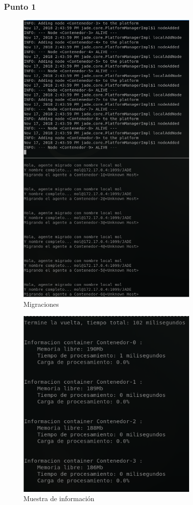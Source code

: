 \documentclass[12pt,journal,compsoc]{IEEEtran}
\begin{document}
\subsubsection{Punto 1}
\label{section:cap-punto1}
\begin{figure}[H]
  \centering
  \label{fig:punto-1-migracion}
  \includegraphics[width=90mm]{images/punto-1/1-migraciones.png}
  \caption{Migraciones}
\end{figure}

\begin{figure}[H]
  \centering
  \label{fig:punto-1-muestra}
  \includegraphics[width=90mm]{images/punto-1/2-muestra.png}
  \caption{Muestra de información}
\end{figure}
\end{document}
